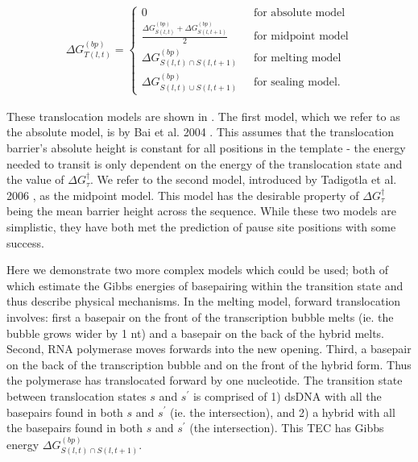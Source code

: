 \documentclass[10pt,letterpaper]{article}
\begin{document}
\begin{eqnarray}
	 \Delta G_{T(l,t)}^{(bp)} = \begin{cases}
	0 & \;\text{ for absolute model} \\
	 \frac{\Delta G_{S(l,t)}^{(bp)} + \Delta G_{S(l,t+1)}^{(bp)}}{2} & \;\text{ for midpoint model} \\
	
	\Delta G_{S(l,t)\cap S(l,t+1)}^{(bp)} & \;\text{ for melting model} \\
	\Delta G_{S(l,t)\cup S(l,t+1)}^{(bp)} & \;\text{ for sealing model.} 
	\end{cases}
\end{eqnarray}




These translocation models are shown in . The first model, which we refer to as the absolute model, is by Bai et al. 2004 \cite{bai2004sequence}. This assumes that the translocation barrier's absolute height is constant for all positions in the template - the energy needed to transit is only dependent on the energy of the translocation state and the value of $\Delta G^\dag_{\tau}$. We refer to the second model, introduced by Tadigotla et al. 2006 \cite{tadigotla2006thermodynamic}, as the midpoint model. This model has the desirable property of $\Delta G^\dag_{\tau}$ being the mean barrier height across the sequence.  While these two models are simplistic, they have both met the prediction of pause site positions with some success.



Here we demonstrate two more complex models which could be used; both of which estimate the Gibbs energies of basepairing within the transition state and thus describe physical mechanisms. In the melting model, forward translocation involves: first a basepair on the front of the transcription bubble melts (ie. the bubble grows wider by 1 nt) and a basepair on the back of the hybrid melts. Second, RNA polymerase moves forwards into the new opening. Third, a basepair on the back of the transcription bubble and on the front of the hybrid form. Thus the polymerase has translocated forward by one nucleotide. The transition state between translocation states $s$ and $s^\prime$ is comprised of 1) dsDNA with all the basepairs found in both $s$ and $s^\prime$ (ie. the intersection), and 2) a hybrid with all the basepairs found in both $s$ and $s^\prime$ (the intersection). This TEC has Gibbs energy $\Delta G_{S(l,t)\cap S(l,t+1)}^{(bp)}$. \par
\end{document}
